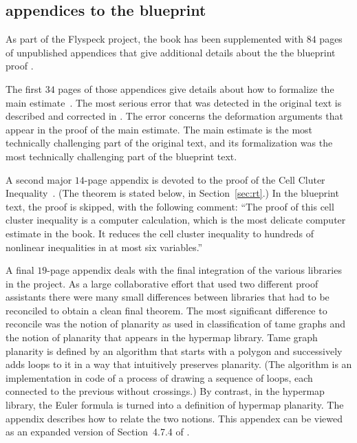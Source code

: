 \subsection{appendices to the blueprint}

As part of the Flyspeck project, the book \cite{DSP} has been
supplemented with $84$ pages of unpublished appendices that give
additional details about the the blueprint proof \cite{XX}.

The first $34$ pages of those appendices
give details about how to formalize the main estimate~\cite[Sec~7.4]{DSP}.
The most serious error that was detected in the original text is described and corrected
in \cite{XX Revision}.  The error concerns the deformation arguments that appear in
the proof of the main estimate.  The main estimate is the most technically challenging
part of the original text, and its formalization was the most technically challenging part of the
blueprint text.    



A second major $14$-page  appendix is devoted to the proof of the
Cell Cluter Inequality~\cite[Thm~6.93]{DSP}.  (The theorem is stated below,
in Section~\ref{sec:rt}.)  In the blueprint text,
the proof is skipped, with the following comment: ``The proof of this
cell cluster inequality is a computer calculation, which is the most
delicate computer estimate in the book.  It reduces the cell cluster
inequality to hundreds of nonlinear inequalities in at most six
variables.''  



A final $19$-page appendix deals with the final integration of the various libraries in
 the project.  As a large collaborative effort that used two different proof assistants there
were many small differences between libraries that had to be reconciled to obtain a 
clean final theorem.   The most significant difference to reconcile was the notion
of planarity as used in classification of tame graphs and the notion of planarity 
that appears in the hypermap library.  Tame graph planarity is
defined by an algorithm that starts with a polygon and successively adds loops to
it in a way that intuitively preserves planarity.  (The algorithm is an implementation
in code of a process of drawing a sequence of loops, each connected to the previous
without crossings.)  By contrast,  in the hypermap library, the Euler formula is turned
into a definition of hypermap planarity.  The appendix describes how to relate
the two notions.  This appendex can be viewed as an expanded version of
Section~4.7.4 of \cite{DSP}.


